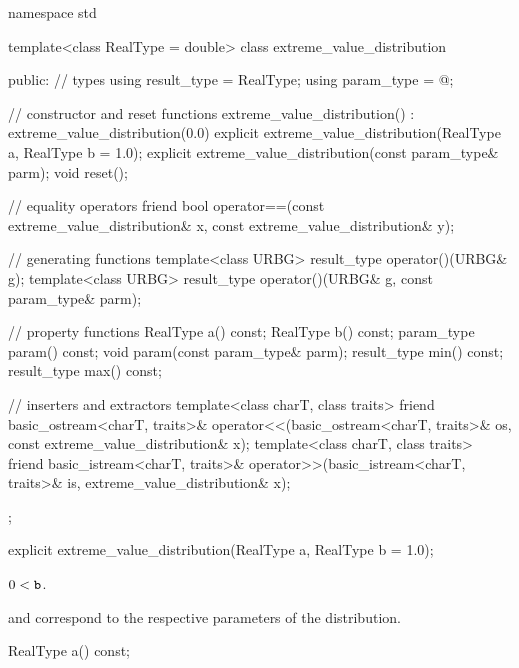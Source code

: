 %
%
\begin{codeblock}
namespace std {
  template<class RealType = double>
  class extreme_value_distribution {
  public:
    // types
    using result_type = RealType;
    using param_type  = @\unspec@;

    // constructor and reset functions
    extreme_value_distribution() : extreme_value_distribution(0.0) {}
    explicit extreme_value_distribution(RealType a, RealType b = 1.0);
    explicit extreme_value_distribution(const param_type& parm);
    void reset();

    // equality operators
    friend bool operator==(const extreme_value_distribution& x,
                           const extreme_value_distribution& y);

    // generating functions
    template<class URBG>
      result_type operator()(URBG& g);
    template<class URBG>
      result_type operator()(URBG& g, const param_type& parm);

    // property functions
    RealType a() const;
    RealType b() const;
    param_type param() const;
    void param(const param_type& parm);
    result_type min() const;
    result_type max() const;

    // inserters and extractors
    template<class charT, class traits>
      friend basic_ostream<charT, traits>&
        operator<<(basic_ostream<charT, traits>& os, const extreme_value_distribution& x);
    template<class charT, class traits>
      friend basic_istream<charT, traits>&
        operator>>(basic_istream<charT, traits>& is, extreme_value_distribution& x);
  };
}
\end{codeblock}


%
\begin{itemdecl}
explicit extreme_value_distribution(RealType a, RealType b = 1.0);
\end{itemdecl}

\begin{itemdescr}
\pnum
\expects
$0 < \tcode{b}$.

\pnum
\remarks
{} and 
correspond to the respective parameters of the distribution.
\end{itemdescr}

%
\begin{itemdecl}
RealType a() const;
\end{itemdecl}

